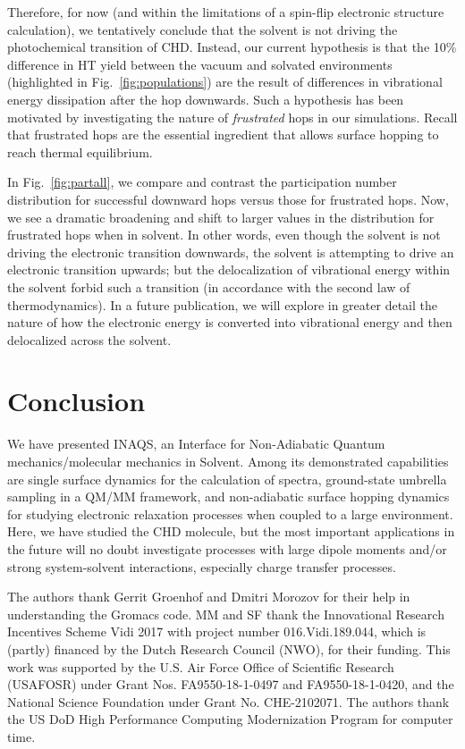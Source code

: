 \documentclass[journal=jctcce,manuscript=article,layout=traditional]{achemso}
\newcommand{\fig}[1]{Fig.~\ref{#1}}
\begin{document}
Therefore, for now (and within the limitations of a spin-flip electronic structure calculation), we tentatively conclude that the solvent is not driving the photochemical transition of CHD.  Instead, our current hypothesis is that the 10\% difference in HT yield between the vacuum and solvated environments (highlighted in \fig{fig:populations}) are the result of differences in vibrational energy dissipation after the hop downwards. Such a hypothesis has been motivated by investigating the nature of  \emph{frustrated} hops in our simulations.  Recall that frustrated hops are the essential ingredient that allows surface hopping to reach thermal equilibrium.

In \fig{fig:partall}, we compare and contrast the participation number distribution for successful downward hops versus those for frustrated hops.
Now, we see a dramatic broadening and shift to larger values in the distribution for frustrated hops when in solvent.
In other words, even though the solvent is not driving the electronic transition downwards, the solvent is attempting to drive an electronic transition upwards; but the delocalization of vibrational energy within the solvent forbid such a transition (in accordance with the second law of thermodynamics). 
%
%
In a future publication, we will explore in greater detail the nature of how the electronic energy is converted into vibrational energy and then delocalized across the solvent.




\section{Conclusion}\label{sec:conclusion}
We have presented INAQS, an Interface for Non-Adiabatic Quantum mechanics/molecular mechanics in Solvent. Among its demonstrated capabilities are single surface dynamics for the calculation of spectra, ground-state umbrella sampling in a QM/MM framework, and non-adiabatic surface hopping dynamics for studying electronic relaxation processes when coupled to a large environment. Here, we have studied the CHD molecule, but the most important applications in the future will no doubt investigate processes with large dipole moments and/or strong system-solvent interactions, especially charge transfer processes.

%


%
%
%
%
%
\begin{acknowledgement}
The authors thank Gerrit Groenhof and Dmitri Morozov for their help in understanding the Gromacs code.
MM and SF thank the Innovational Research Incentives Scheme Vidi 2017 with project number 016.Vidi.189.044, which is (partly) financed by the Dutch Research Council (NWO), for their funding.
This work was supported by the U.S. Air Force Office of Scientific Research (USAFOSR) under Grant Nos. FA9550-18-1-0497 and FA9550-18-1-0420, and the National Science Foundation under Grant No. CHE-2102071.
The authors thank the US DoD High Performance Computing Modernization Program for computer time.
\end{acknowledgement}
\end{document}
